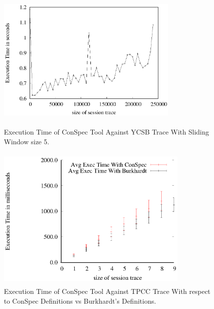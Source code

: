 \documentclass[journal,compsoc]{IEEEtran}
\begin{document}
\begin{figure}%
        \includegraphics[width=3.5in,height=2.8in]
                    {conspecExecutionTimes.eps} %
        \caption{Execution Time of ConSpec Tool Against YCSB Trace With Sliding Window size 5.}
        \label{fig:exampleIter}
\end{figure}
     \begin{figure}%
        \includegraphics[width=3.7in,height=2.8in]
                    {conspecTPCCvarhist.eps} %
        \caption{Execution Time of ConSpec Tool Against TPCC Trace With respect to ConSpec Definitions vs Burkhardt's Definitions.}
        \label{fig:examplefulltpcc}
\end{figure}
\end{document}
